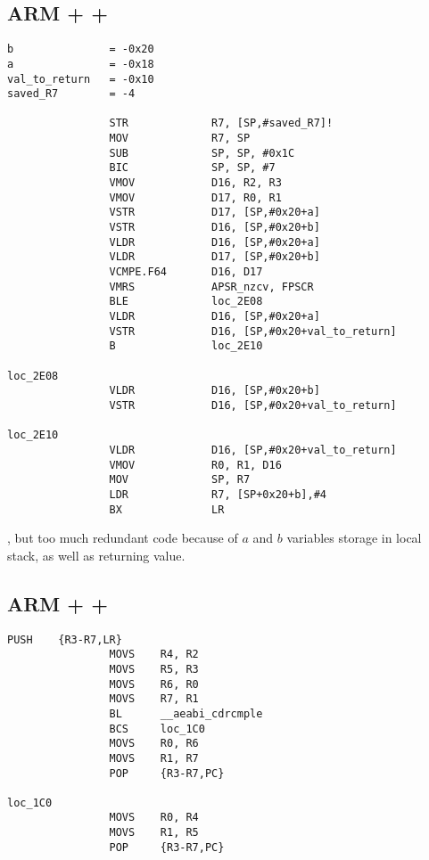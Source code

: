 \subsection{ARM + \NonOptimizingXcode + \ARMMode}

\begin{lstlisting}[caption=\NonOptimizingXcode + \ARMMode]
b               = -0x20
a               = -0x18
val_to_return   = -0x10
saved_R7        = -4

                STR             R7, [SP,#saved_R7]!
                MOV             R7, SP
                SUB             SP, SP, #0x1C
                BIC             SP, SP, #7
                VMOV            D16, R2, R3
                VMOV            D17, R0, R1
                VSTR            D17, [SP,#0x20+a]
                VSTR            D16, [SP,#0x20+b]
                VLDR            D16, [SP,#0x20+a]
                VLDR            D17, [SP,#0x20+b]
                VCMPE.F64       D16, D17
                VMRS            APSR_nzcv, FPSCR
                BLE             loc_2E08
                VLDR            D16, [SP,#0x20+a]
                VSTR            D16, [SP,#0x20+val_to_return]
                B               loc_2E10

loc_2E08
                VLDR            D16, [SP,#0x20+b]
                VSTR            D16, [SP,#0x20+val_to_return]

loc_2E10
                VLDR            D16, [SP,#0x20+val_to_return]
                VMOV            R0, R1, D16
                MOV             SP, R7
                LDR             R7, [SP+0x20+b],#4
                BX              LR
\end{lstlisting}

, 
{but too much redundant code because of $a$ and $b$ variables storage in local stack, as well
as returning value.}

\subsection{ARM + \OptimizingKeil + \ThumbMode}

\begin{lstlisting}[caption=\OptimizingKeil + \ThumbMode]
                PUSH    {R3-R7,LR}
                MOVS    R4, R2
                MOVS    R5, R3
                MOVS    R6, R0
                MOVS    R7, R1
                BL      __aeabi_cdrcmple
                BCS     loc_1C0
                MOVS    R0, R6
                MOVS    R1, R7
                POP     {R3-R7,PC}

loc_1C0
                MOVS    R0, R4
                MOVS    R1, R5
                POP     {R3-R7,PC}
\end{lstlisting}

